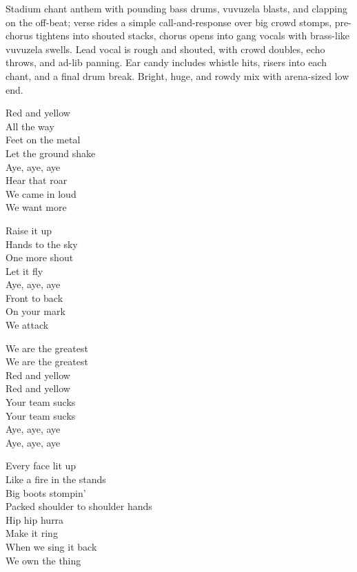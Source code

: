 
\begin{notes}
\end{notes}
\begin{style}
Stadium chant anthem with pounding bass drums, vuvuzela blasts, and clapping on the off-beat; verse rides a simple call-and-response over big crowd stomps, pre-chorus tightens into shouted stacks, chorus opens into gang vocals with brass-like vuvuzela swells. Lead vocal is rough and shouted, with crowd doubles, echo throws, and ad-lib panning. Ear candy includes whistle hits, risers into each chant, and a final drum break. Bright, huge, and rowdy mix with arena-sized low end.
\end{style}
\begin{lyrics}
Red and yellow\\
All the way\\
Feet on the metal\\
Let the ground shake\\
Aye, aye, aye\\
Hear that roar\\
We came in loud\\
We want more

Raise it up\\
Hands to the sky\\
One more shout\\
Let it fly\\
Aye, aye, aye\\
Front to back\\
On your mark\\
We attack

We are the greatest\\
We are the greatest\\
Red and yellow\\
Red and yellow\\
Your team sucks\\
Your team sucks\\
Aye, aye, aye\\
Aye, aye, aye

Every face lit up\\
Like a fire in the stands\\
Big boots stompin'\\
Packed shoulder to shoulder hands\\
Hip hip hurra\\
Make it ring\\
When we sing it back\\
We own the thing


\end{lyrics}
